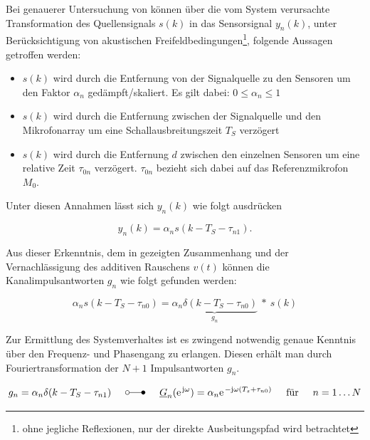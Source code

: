 Bei genauerer Untersuchung von  können über die vom System verursachte Transformation des Quellensignals $s(k)$ in das Sensorsignal $y_n(k)$, unter Berücksichtigung von akustischen Freifeldbedingungen\footnote{ohne jegliche Reflexionen, nur der direkte Ausbeitungspfad wird betrachtet}, folgende Aussagen getroffen werden:


\begin{itemize}
    \item $s(k)$ wird durch die Entfernung von der Signalquelle zu den Sensoren um den Faktor $\alpha_n$ gedämpft/skaliert. Es gilt dabei: $0 \leq \alpha_n \leq 1$
    \item $s(k)$ wird durch die Entfernung zwischen der Signalquelle und den Mikrofonarray um eine Schallausbreitungszeit $T_S$ verzögert 
    \item $s(k)$ wird durch die Entfernung $d$ zwischen den einzelnen Sensoren um eine relative Zeit $\tau_{0n}$ verzögert. $\tau_{0n}$ bezieht sich dabei auf das Referenzmikrofon $M_0$.
     
\end{itemize}

Unter diesen Annahmen lässt sich $y_n(k)$ wie folgt ausdrücken

\begin{equation}
    y_n(k) = \alpha_n s(k - T_S- \tau_{n1}).
\end{equation}

Aus dieser Erkenntnis, dem in  gezeigten Zusammenhang und der Vernachlässigung des additiven Rauschens $v(t)$ können die Kanalimpulsantworten $g_n$ wie folgt gefunden werden:

\begin{equation}
     \alpha_n s(k - T_S- \tau_{n0}) = \underbrace{\alpha_n \delta(k - T_S- \tau_{n0})}_{g_n} ~ \ast ~  s(k)
\end{equation}

Zur Ermittlung des Systemverhaltes ist es zwingend notwendig genaue Kenntnis über den Frequenz- und Phasengang zu erlangen. Diesen erhält man durch Fouriertransformation der $N+1$ Impulsantworten $g_n$.

\begin{equation}
g_n = \alpha_n \delta(k - T_S - \tau_{n1}) \hspace{0.5cm} \laplace \hspace{0.5cm} \underline{G}_n(\e^{\im \omega}) = \alpha_n \e^{-\im \omega (T_s + \tau_{n0})} \hspace{0.5cm} \text{für} \hspace{0.5cm} n=1 \dots N
\end{equation}


